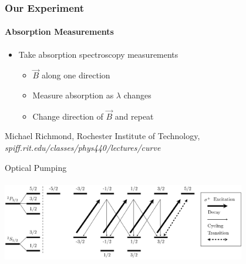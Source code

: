 \documentclass{beamer}
\begin{document}
\begin{frame}
  \frametitle{Our Experiment}
  \framesubtitle{Absorption Measurements}
  \begin{itemize}
	\item Take absorption spectroscopy measurements
	  \begin{itemize}
		\item $\vec B$ along one direction
		\item Measure absorption as $\lambda$ changes
		\item Change direction of $\vec B$ and repeat
	  \end{itemize}
  \end{itemize}
  \begin{center}
  \end{center}
  {\tiny Michael Richmond, Rochester Institute of Technology, \textit{spiff.rit.edu/classes/phys440/lectures/curve}}
\end{frame}

\begin{frame}{Optical Pumping}
  \framesubtitle{}
  \centering
  \includegraphics[width=0.8\textwidth]{../Thesis/FullPaper/Images/tikz/opticalpumping.pdf}
\end{frame}
\end{document}
